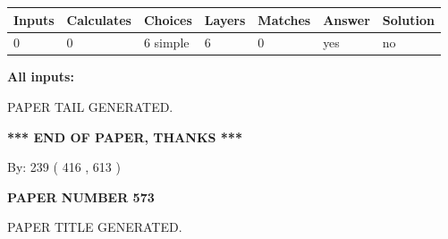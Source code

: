 \documentclass{ctexart}
\begin{document}
 
   
   
   
   
\noindent\begin{tabular}{|l|l|l|l|l|l|l|}
 \hline
Inputs & Calculates & Choices & Layers & Matches & Answer & Solution \\ \hline
 0  & 
 0  & 
 6
  simple  
  & 
 6  & 
 0  & 
  yes & 
  no 
  \\ \hline
 \end{tabular}
   
   
   
   
\noindent{}
   
   
   
   
\noindent\vspace{0.1in}\hspace{-0.08in} {\textbf{\Large{All inputs: }}}
   
   
   
   
   
   
 \vspace{0.2in}
 
   
   
\vspace{2.0in} PAPER TAIL GENERATED.
   
   
   
   
\vspace{1.0in} 
{\textbf{\large{ *** END OF PAPER, THANKS *** }}} 
   
   
\hspace{1.0in} By: 
 239 ( 416 ,  613 )
   
   
   
   
\newpage 
\setcounter{page}{ 
   573001 } 
   
   
   
   
 {\textbf{ \Large{ PAPER NUMBER  573  }}}
   
   
\vspace{0.2in}
   
   
   
   
   
   
   
   
 \vspace{0.2in}
 
 
 
 
   
   
 PAPER TITLE GENERATED.
   
\end{document}
